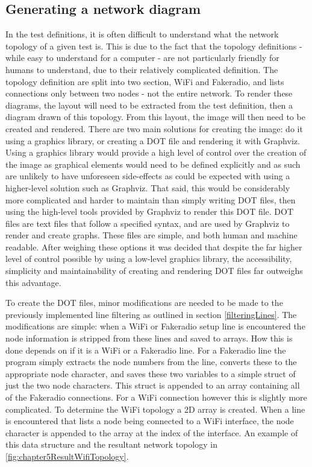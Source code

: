 \subsection{Generating a network diagram}
In the test definitions, it is often difficult to understand what the network topology of a given test is.
This is due to the fact that the topology definitions - while easy to understand for a computer - are not particularly friendly for humans to understand, due to their relatively complicated definition.
The topology definition are split into two section, WiFi and Fakeradio, and lists connections only between two nodes - not the entire network.
To render these diagrams, the layout will need to be extracted from the test definition, then a diagram drawn of this topology.
From this layout, the image will then need to be created and rendered.
There are two main solutions for creating the image: do it using a graphics library, or creating a DOT file and rendering it with Graphviz.
Using a graphics library would provide a high level of control over the creation of the image as graphical elements would need to be defined explicitly and as such are unlikely to have unforeseen side-effects as could be expected with using a higher-level solution such as Graphviz.
That said, this would be considerably more complicated and harder to maintain than simply writing DOT files, then using the high-level tools provided by Graphviz to render this DOT file.
DOT files are text files that follow a specified syntax, and are used by Graphviz to render and create graphs.
These files are simple, and both human and machine readable. 
After weighing these options it was decided that despite the far higher level of control possible by using a low-level graphics library, the accessibility, simplicity and maintainability of creating and rendering DOT files far outweighs this advantage.

To create the DOT files, minor modifications are needed to be made to the previously implemented line filtering as outlined in section \ref{filteringLines}.
The modifications are simple: when a WiFi or Fakeradio setup line is encountered the node information is stripped from these lines and saved to arrays.
How this is done depends on if it is a WiFi or a Fakeradio line.
For a Fakeradio line the program simply extracts the node numbers  from the line, converts these to the appropriate node character, and saves these two variables to a simple struct of just the two node characters.
This struct is appended to an array containing all of the Fakeradio connections.
For a WiFi connection however this is slightly more complicated.
To determine the WiFi topology a 2D array is created.
When a line is encountered that lists a node being connected to a WiFi interface, the node character is appended to the array at the index of the interface.
An example of this data structure and the resultant network topology in \figurename{ \ref{fig:chapter5ResultWifiTopology}}.

